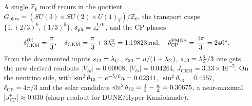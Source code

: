 A single $\mathbb Z_6$ motif recurs in the quotient $G_{\mathrm{phys}}=(SU(3){\times}SU(2){\times}U(1)_Y)/\mathbb Z_6$,
the transport cusps $\{1,(2/3)^6,(1/3)^6\}$, $\delta_{\mathrm{ph}}=z_\star^{1/6}$, and the CP phases
\begin{equation}
  \delta^{(0)}_{\mathrm{CKM}}=\frac{\pi}{3},\quad
  \delta_{\mathrm{CKM}}=\frac{\pi}{3}+3\lambda_C^2=1.19823\,\mathrm{rad},\quad
  \delta^{\mathrm{PMNS}}_{\mathrm{CP}}=\frac{4\pi}{3}=240^\circ .
\end{equation}
From the documented inputs $s_{12}=\lambda_C$, $s_{23}=u/(1+\lambda_C)$, $s_{13}=\lambda_C^3/3$ one gets the new
derived readouts $|V_{td}|=0.00908$, $|V_{ts}|=0.04264$, $J_{\mathrm{CKM}}=3.33\times10^{-5}$. On
the neutrino side, with $\sin^2\theta_{13}=e^{-5/6}u=0.02311$, $\sin^2\theta_{23}=0.4557$,
$\delta_{\mathrm{CP}}=4\pi/3$ and the solar candidate $\sin^2\theta_{12}=\tfrac13-\tfrac{u}{2}=0.30675$,
a near-maximal $|J^\nu_{\mathrm{CP}}|\approx0.030$ (sharp readout for DUNE/Hyper-Kamiokande). \mC


